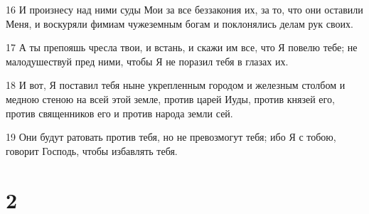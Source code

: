 \par 16 И произнесу над ними суды Мои за все беззакония их, за то, что они оставили Меня, и воскуряли фимиам чужеземным богам и поклонялись делам рук своих.
\par 17 А ты препояшь чресла твои, и встань, и скажи им все, что Я повелю тебе; не малодушествуй пред ними, чтобы Я не поразил тебя в глазах их.
\par 18 И вот, Я поставил тебя ныне укрепленным городом и железным столбом и медною стеною на всей этой земле, против царей Иуды, против князей его, против священников его и против народа земли сей.
\par 19 Они будут ратовать против тебя, но не превозмогут тебя; ибо Я с тобою, говорит Господь, чтобы избавлять тебя.

\chapter{2}

